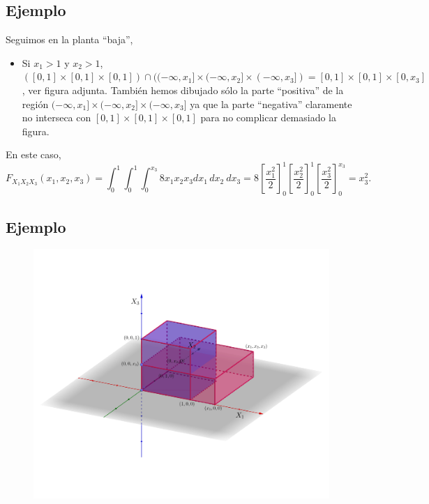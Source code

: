 \documentclass[]{book}
\providecommand{\tightlist}{%
  \setlength{\itemsep}{0pt}\setlength{\parskip}{0pt}}
\begin{document}
\hypertarget{ejemplo-105}{%
\subsection{Ejemplo}\label{ejemplo-105}}

Seguimos en la planta ``baja'',

\begin{itemize}
\tightlist
\item
  Si \(x_1>1\) y \(x_2>1\), \(([0,1]\times [0,1]\times [0,1])\cap ((-\infty,x_1]\times (-\infty,x_2]\times (-\infty,x_3])=[0,1]\times [0,1]\times [0,x_3]\), ver figura adjunta. También hemos dibujado sólo la parte ``positiva'' de la región \((-\infty,x_1]\times (-\infty,x_2]\times (-\infty,x_3]\) ya que la parte ``negativa'' claramente no interseca con \([0,1]\times [0,1]\times [0,1]\) para no complicar demasiado la figura.
\end{itemize}

En este caso,
\[
F_{X_1X_2X_3}(x_1,x_2,x_3)=\int_{0}^{1}\int_{0}^{1}\int_{0}^{x_3} 8 x_1 x_2 x_3 dx_1\, dx_2\ dx_3 = 
8\left[\frac{x_1^2}{2}\right]_0^{1}\left[\frac{x_2^2}{2}\right]_0^{1}\left[\frac{x_3^2}{2}\right]_0^{x_3} = x_3^2.
\]

\hypertarget{ejemplo-106}{%
\subsection{Ejemplo}\label{ejemplo-106}}

\begin{figure}
\includegraphics[width=800px]{Images/Fx1x2x3bajosx1x2} \end{figure}
\end{document}
